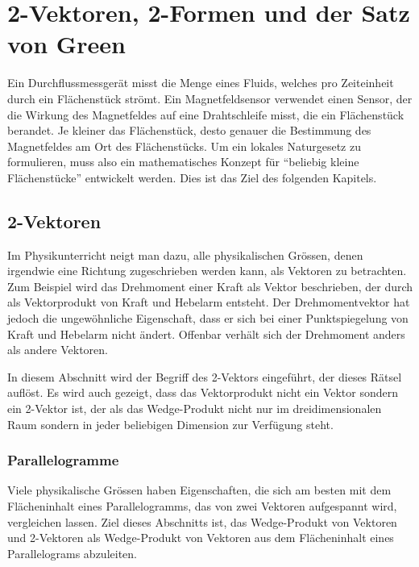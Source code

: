 %
%
%
\chapter{2-Vektoren, 2-Formen und der Satz von Green
\label{chapter:green}}
Ein Durchflussmessgerät misst die Menge eines Fluids, welches pro
Zeiteinheit durch ein Flächenstück strömt.
Ein Magnetfeldsensor verwendet einen Sensor, der die Wirkung des Magnetfeldes
auf eine Drahtschleife misst, die ein Flächenstück berandet.
Je kleiner das Flächenstück, desto genauer die Bestimmung des Magnetfeldes
am Ort des Flächenstücks.
Um ein lokales Naturgesetz zu formulieren, muss also ein mathematisches
Konzept für ``beliebig kleine Flächenstücke'' entwickelt werden.
Dies ist das Ziel des folgenden Kapitels.

%
%
\section{2-Vektoren
\label{buch:green:section:2vektoren}}
Im Physikunterricht neigt man dazu, alle physikalischen Grössen,
denen irgendwie eine Richtung zugeschrieben werden kann, als
Vektoren zu betrachten.
Zum Beispiel wird das Drehmoment einer Kraft als Vektor beschrieben,
der durch als Vektorprodukt von Kraft und Hebelarm entsteht.
Der Drehmomentvektor hat jedoch die ungewöhnliche Eigenschaft, dass
er sich bei einer Punktspiegelung von Kraft und Hebelarm nicht ändert.
Offenbar verhält sich der Drehmoment anders als andere Vektoren.

In diesem Abschnitt wird der Begriff des 2-Vektors eingeführt, der
dieses Rätsel auflöst.
Es wird auch gezeigt, dass das Vektorprodukt nicht ein Vektor sondern
ein 2-Vektor ist, der als das Wedge-Produkt nicht nur im dreidimensionalen
Raum sondern in jeder beliebigen Dimension zur Verfügung steht.

%
%
\subsection{Parallelogramme}
Viele physikalische Grössen haben Eigenschaften, die sich am besten
mit dem Flächeninhalt eines Parallelogramms, das von zwei Vektoren
aufgespannt wird, vergleichen lassen.
Ziel dieses Abschnitts ist, das Wedge-Produkt von Vektoren und 
2-Vektoren als Wedge-Produkt von Vektoren aus dem Flächeninhalt
eines Parallelograms abzuleiten.


